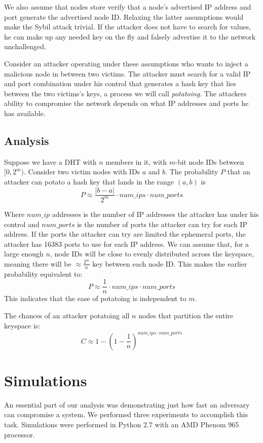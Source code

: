 \documentclass[a4paper]{IEEEtran}
\begin{document}
We also assume that nodes store verify that a node's advertised IP address and port generate the advertised node ID. 
Relaxing the latter assumptions would  make the Sybil attack trivial. 
If the attacker does not have to search for values, he can make up any needed key on the fly and falsely advertise it to the network unchallenged.

Consider an attacker operating under these assumptions who wants to inject a malicious node in between two victims.
The attacker must search for a valid IP and port combination under his control that generates a hash key that lies between the two victims's keys, a process we will call \textit{potatoing}.
The attackers ability to compromise the network depends on what IP addresses and ports he has available.



\subsection{Analysis}
Suppose we have a DHT with $n$ members in it, with $m$-bit node IDs between $[0,2^{m})$. 
Consider two victim nodes with IDs $a$ and $b$.
The probability $P$ that an attacker can potato a hash key that lands in the range $(a,b)$ is 
$$ P \approx \frac{|b-a|}{2^{m}}\cdot num\_ips \cdot num\_ports  $$

Where $num\_ip$ addresses is the number of IP addresses the attacker has under his control and $num\_ports$ is the number of ports the attacker can try for each IP address.
If the ports the attacker can try are limited the ephemeral ports, the attacker has 16383 ports to use for each IP address.
We can assume that, for a large enough $n$, node IDs will be close to evenly distributed across the keyspace, meaning there will be $\approx \frac{2^{m}}{n}$ key between each node ID.
This makes the earlier probability equivalent to:
$$ P \approx \frac{1}{n}\cdot num\_ips \cdot num\_ports  $$
This indicates that the ease of potatoing is independent to $m$.

The chances of an attacker potatoing all $n$ nodes that partition the entire keyspace is:
$$C \approx  1 - (1 -\frac{1}{n})^{num\_ips \cdot num\_ports}  $$


\section{Simulations}
An essential part of our analysis was demonstrating just how fast an adversary can compromise a system.
We performed three experiments to accomplish this task.
Simulations were performed in Python 2.7  with an AMD Phenom 965 processor.  
\end{document}
